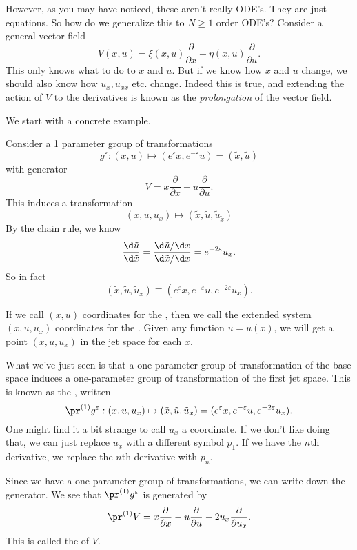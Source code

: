 \documentclass[a4paper]{article}
\begin{document}
However, as you may have noticed, these aren't really ODE's. They are just equations. So how do we generalize this to $N \geq 1$ order ODE's? Consider a general vector field
\[
  V(x, u) = \xi(x, u) \frac{\partial}{\partial x} + \eta(x, u) \frac{\partial}{\partial u}.
\]
This only knows what to do to $x$ and $u$. But if we know how $x$ and $u$ change, we should also know how $u_x, u_{xx}$ etc. change. Indeed this is true, and extending the action of $V$ to the derivatives is known as the \emph{prolongation} of the vector field.

We start with a concrete example.

\begin{eg}
  Consider a 1 parameter group of transformations
  \[
    g^\varepsilon: (x, u) \mapsto (e^\varepsilon x, e^{-\varepsilon}u) = (\tilde{x}, \tilde{u})
  \]
  with generator
  \[
    V = x\frac{\partial}{\partial x} - u\frac{\partial}{\partial u}.
  \]
  This induces a transformation
  \[
    (x, u, u_x) \mapsto (\tilde{x}, \tilde{u}, \tilde{u}_{\tilde{x}})
  \]
  By the chain rule, we know
  \[
    \frac{\d \tilde{u}}{\d \tilde{x}} = \frac{\d\tilde{u}/\d x}{\d \tilde{x}/\d x} = e^{-2 \varepsilon} u_x.
  \]
  So in fact
  \[
    (\tilde{x}, \tilde{u}, \tilde{u}_{\tilde{x}}) \equiv (e^\varepsilon x, e^{-\varepsilon} u, e^{-2\varepsilon} u_x).
  \]
\end{eg}

If we call $(x, u)$ coordinates for the , then we call the extended system $(x, u, u_x)$ coordinates for the . Given any function $u = u(x)$, we will get a point $(x, u, u_x)$ in the jet space for each $x$.

What we've just seen is that a one-parameter group of transformation of the base space induces a one-parameter group of transformation of the first jet space. This is known as the , written
\[
  \pr^{(1)}g^\varepsilon: (x, u, u_x) \mapsto (\tilde{x}, \tilde{u}, \tilde{u}_{\tilde{x}}) = (e^\varepsilon x, e^{-\varepsilon} u, e^{-2\varepsilon} u_x).
\]
One might find it a bit strange to call $u_x$ a coordinate. If we don't like doing that, we can just replace $u_x$ with a different symbol $p_1$. If we have the $n$th derivative, we replace the $n$th derivative with $p_n$.

Since we have a one-parameter group of transformations, we can write down the generator. We see that $\pr^{(1)}g^\varepsilon$ is generated by
\[
  \pr^{(1)} V = x\frac{\partial}{\partial x} - u \frac{\partial}{\partial u} - 2 u_x \frac{\partial}{\partial u_x}.
\]
This is called the  of $V$.
\end{document}
